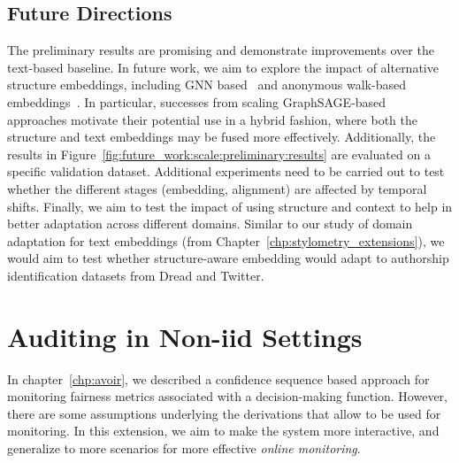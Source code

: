 \subsection{Future Directions}
The preliminary results are promising and demonstrate improvements over the text-based baseline.
In future work, we aim to explore the impact of alternative structure embeddings, including GNN based~\cite{velivckovic2018graph,hamilton2017inductive} and anonymous walk-based embeddings~\citep{ivanov2018anonymous,wang2020inductive}.
In particular, successes from scaling GraphSAGE-based~\cite{hamilton2017inductive,ying2018graph} approaches motivate their potential use in a hybrid fashion, where both the structure and text embeddings may be fused more effectively.
Additionally, the results in Figure~\ref{fig:future_work:scale:preliminary:results} are evaluated on a specific validation dataset.
Additional experiments need to be carried out to test whether the different stages (embedding, alignment) are affected by temporal shifts.
Finally, we aim to test the impact of using structure and context to help in better adaptation across different domains.
Similar to our study of domain adaptation for text embeddings (from Chapter~\ref{chp:stylometry_extensions}), we would aim to test whether structure-aware embedding would adapt to authorship identification datasets from Dread and Twitter.

\section{Auditing in Non-iid Settings}
\label{sec:future_work:monitoring}
In chapter~\ref{chp:avoir},  we described a confidence sequence based approach for monitoring fairness metrics associated with a decision-making function.
However, there are some assumptions underlying the derivations that allow \AVOIRmethodname{} to be used for monitoring.
In this extension, we aim to make the \AVOIRmethodname{} system more interactive, and generalize to more scenarios for more effective \textit{online monitoring}.

